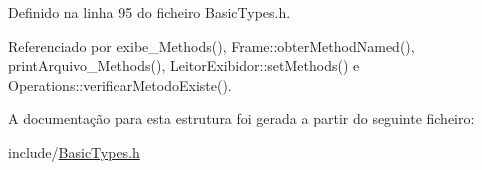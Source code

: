 Definido na linha 95 do ficheiro Basic\+Types.\+h.



Referenciado por exibe\+\_\+\+Methods(), Frame\+::obter\+Method\+Named(), print\+Arquivo\+\_\+\+Methods(), Leitor\+Exibidor\+::set\+Methods() e Operations\+::verificar\+Metodo\+Existe().



A documentação para esta estrutura foi gerada a partir do seguinte ficheiro\+:\begin{DoxyCompactItemize}
\item 
include/\hyperlink{BasicTypes_8h}{Basic\+Types.\+h}\end{DoxyCompactItemize}
